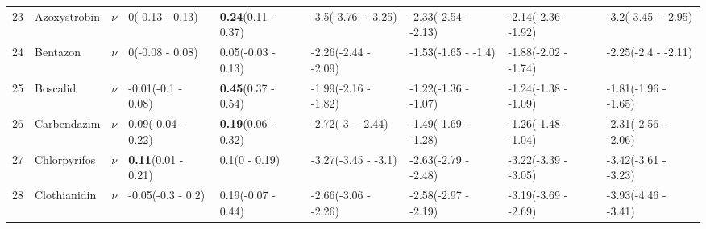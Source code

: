\begin{longtable}{lp{2cm}p{0.6cm}p{1.8cm}p{1.8cm}p{1.8cm}p{1.8cm}p{1.8cm}p{1.8cm}}
   \midrule
23 & Azoxystrobin & $\nu$ & 0\newline (-0.13 - 0.13) & \textbf{0.24}\newline (0.11 - 0.37) & -3.5\newline (-3.76 - -3.25) & -2.33\newline (-2.54 - -2.13) & -2.14\newline (-2.36 - -1.92) & -3.2\newline (-3.45 - -2.95) \\ 
  24 & Bentazon & $\nu$ & 0\newline (-0.08 - 0.08) & 0.05\newline (-0.03 - 0.13) & -2.26\newline (-2.44 - -2.09) & -1.53\newline (-1.65 - -1.4) & -1.88\newline (-2.02 - -1.74) & -2.25\newline (-2.4 - -2.11) \\ 
  25 & Boscalid & $\nu$ & -0.01\newline (-0.1 - 0.08) & \textbf{0.45}\newline (0.37 - 0.54) & -1.99\newline (-2.16 - -1.82) & -1.22\newline (-1.36 - -1.07) & -1.24\newline (-1.38 - -1.09) & -1.81\newline (-1.96 - -1.65) \\ 
  26 & Carbendazim & $\nu$ & 0.09\newline (-0.04 - 0.22) & \textbf{0.19}\newline (0.06 - 0.32) & -2.72\newline (-3 - -2.44) & -1.49\newline (-1.69 - -1.28) & -1.26\newline (-1.48 - -1.04) & -2.31\newline (-2.56 - -2.06) \\ 
  27 & Chlorpyrifos & $\nu$ & \textbf{0.11}\newline (0.01 - 0.21) & 0.1\newline (0 - 0.19) & -3.27\newline (-3.45 - -3.1) & -2.63\newline (-2.79 - -2.48) & -3.22\newline (-3.39 - -3.05) & -3.42\newline (-3.61 - -3.23) \\ 
  28 & Clothianidin & $\nu$ & -0.05\newline (-0.3 - 0.2) & 0.19\newline (-0.07 - 0.44) & -2.66\newline (-3.06 - -2.26) & -2.58\newline (-2.97 - -2.19) & -3.19\newline (-3.69 - -2.69) & -3.93\newline (-4.46 - -3.41) \\ 

\end{longtable}

